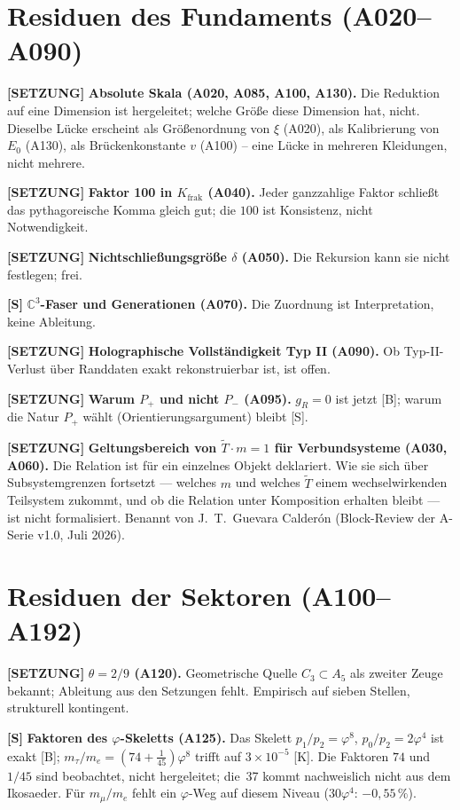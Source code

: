 \section{Residuen des Fundaments (A020--A090)}

\textbf{[SETZUNG]} \textbf{Absolute Skala (A020, A085, A100, A130).}
Die Reduktion auf eine Dimension ist hergeleitet; welche Größe diese Dimension
hat, nicht. Dieselbe Lücke erscheint als Größenordnung von $\xi$ (A020), als
Kalibrierung von $E_0$ (A130), als Brückenkonstante $v$ (A100) -- eine Lücke
in mehreren Kleidungen, nicht mehrere.

\textbf{[SETZUNG]} \textbf{Faktor 100 in $K_\text{frak}$ (A040).}
Jeder ganzzahlige Faktor schließt das pythagoreische Komma gleich gut; die
$100$ ist Konsistenz, nicht Notwendigkeit.

\textbf{[SETZUNG]} \textbf{Nichtschließungsgröße $\delta$ (A050).}
Die Rekursion kann sie nicht festlegen; frei.

\textbf{[S]} \textbf{$\mathbb{C}^3$-Faser und Generationen (A070).}
Die Zuordnung ist Interpretation, keine Ableitung.

\textbf{[SETZUNG]} \textbf{Holographische Vollständigkeit Typ II (A090).}
Ob Typ-II-Verlust über Randdaten exakt rekonstruierbar ist, ist offen.

\textbf{[SETZUNG]} \textbf{Warum $P_+$ und nicht $P_-$ (A095).}
$g_R=0$ ist jetzt [B]; warum die Natur $P_+$ wählt (Orientierungsargument)
bleibt [S].

\textbf{[SETZUNG]} \textbf{Geltungsbereich von $\tilde{T}\cdot m=1$ für
Verbundsysteme (A030, A060).}
Die Relation ist für ein einzelnes Objekt deklariert. Wie sie sich über
Subsystemgrenzen fortsetzt --- welches $m$ und welches $\tilde{T}$ einem
wechselwirkenden Teilsystem zukommt, und ob die Relation unter Komposition
erhalten bleibt --- ist nicht formalisiert. Benannt von J.~T.~Guevara
Calderón (Block-Review der A-Serie v1.0, Juli 2026).

\section{Residuen der Sektoren (A100--A192)}

\textbf{[SETZUNG]} \textbf{$\theta=2/9$ (A120).} Geometrische Quelle $C_3\subset
A_5$ als zweiter Zeuge bekannt; Ableitung aus den Setzungen fehlt. Empirisch
auf sieben Stellen, strukturell kontingent.

\textbf{[S]} \textbf{Faktoren des $\varphi$-Skeletts (A125).} Das Skelett
$p_1/p_2=\varphi^8$, $p_0/p_2=2\varphi^4$ ist exakt [B];
$m_\tau/m_e=(74+\tfrac1{45})\varphi^8$ trifft auf $3\times10^{-5}$ [K]. Die
Faktoren $74$ und $1/45$ sind beobachtet, nicht hergeleitet; die~37 kommt
nachweislich nicht aus dem Ikosaeder. Für $m_\mu/m_e$ fehlt ein $\varphi$-Weg
auf diesem Niveau ($30\varphi^4$: $-0{,}55\,\%$).

